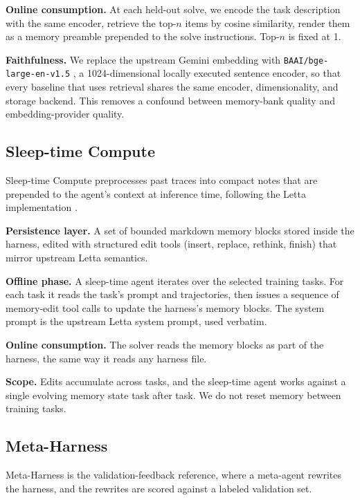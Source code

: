 \documentclass{llmxive}
\begin{document}
\noindent\textbf{Online consumption.}
At each held-out solve, we encode the task description with the same encoder, retrieve the top-$n$ items by cosine similarity, render them as a memory preamble prepended to the solve instructions.
Top-$n$ is fixed at 1.

\noindent\textbf{Faithfulness.}
We replace the upstream Gemini embedding with \texttt{BAAI/bge-large-en-v1.5} \citep{xiao2023cpack}, a 1024-dimensional locally executed sentence encoder, so that every baseline that uses retrieval shares the same encoder, dimensionality, and storage backend.
This removes a confound between memory-bank quality and embedding-provider quality.

\subsection{Sleep-time Compute \citep{lin2025sleeptime}}

Sleep-time Compute preprocesses past traces into compact notes that are prepended to the agent's context at inference time, following the Letta implementation \citep{packer2023memgpt}.

\noindent\textbf{Persistence layer.}
A set of bounded markdown memory blocks stored inside the harness, edited with structured edit tools (insert, replace, rethink, finish) that mirror upstream Letta semantics.

\noindent\textbf{Offline phase.}
A sleep-time agent iterates over the selected training tasks.
For each task it reads the task's prompt and trajectories, then issues a sequence of memory-edit tool calls to update the harness's memory blocks.
The system prompt is the upstream Letta system prompt, used verbatim.

\noindent\textbf{Online consumption.}
The solver reads the memory blocks as part of the harness, the same way it reads any harness file.

\noindent\textbf{Scope.}
Edits accumulate across tasks, and the sleep-time agent works against a single evolving memory state task after task.
We do not reset memory between training tasks.

\subsection{Meta-Harness \citep{lee2026metaharness}}

Meta-Harness is the validation-feedback reference, where a meta-agent rewrites the harness, and the rewrites are scored against a labeled validation set.
\end{document}
